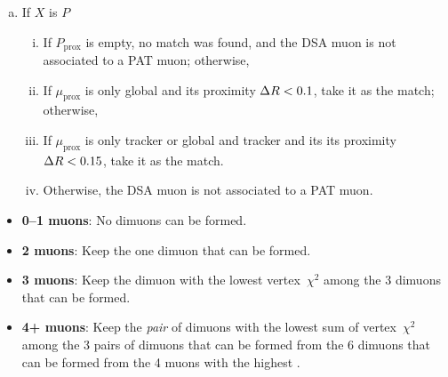 \begin{enumerate}
\begin{enumerate}[a.]
\begin{enumerate}[i.]
        \end{enumerate}
      \item If $X$ is $P$
        \begin{enumerate}[i.]
          \item If $P_\text{prox}$ is empty, no match was found, and the DSA muon is not associated to a PAT muon; otherwise,
          \item If $\mu_\text{prox}$ is only global and its proximity $\Delta R < 0.1$, take it as the match; otherwise,
          \item If $\mu_\text{prox}$ is only tracker or global and tracker and its its proximity $\Delta R < 0.15$, take it as the match.
          \item Otherwise, the DSA muon is not associated to a PAT muon.
        \end{enumerate}
    \end{enumerate}
\end{enumerate}

\begin{itemize}
  \item \textbf{0--1 muons}: No dimuons can be formed.
  \item    \textbf{2 muons}: Keep the one dimuon that can be formed.
  \item    \textbf{3 muons}: Keep the dimuon with the lowest vertex~$\chi^2$ among the 3 dimuons that can be formed.
  \item   \textbf{4+ muons}: Keep the \emph{pair} of dimuons with the lowest sum of vertex~$\chi^2$ among the 3 pairs of dimuons that can be formed from the 6 dimuons that can be formed from the 4 muons with the highest \pT.
\end{itemize}
